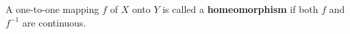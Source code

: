 A one-to-one mapping $f$ of $X$ onto $Y$ is called a \textbf{homeomorphism} if both $f$ and $f^{-1}$ are continuous.
